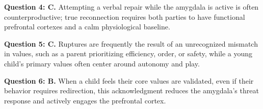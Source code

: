 \begin{practiceexercise}
\textbf{Question 4: C.} Attempting a verbal repair while the amygdala is active is often counterproductive; true reconnection requires both parties to have functional prefrontal cortexes and a calm physiological baseline.
\vspace{\fill}

\textbf{Question 5: C.} Ruptures are frequently the result of an unrecognized mismatch in values, such as a parent prioritizing efficiency, order, or safety, while a young child's primary values often center around autonomy and play.
\vspace{\fill}

\textbf{Question 6: B.} When a child feels their core values are validated, even if their behavior requires redirection, this acknowledgment reduces the amygdala's threat response and actively engages the prefrontal cortex.
\vspace{\fill}
\newpage


\end{practiceexercise}
